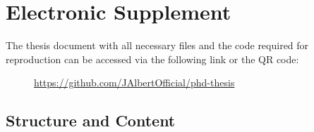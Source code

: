 \section{Electronic Supplement}


The thesis document with all necessary files and the code required for reproduction can be accessed via the following link or the QR code:

\begin{figure}[!h]
    \centering
    \begin{minipage}{0.6\textwidth}
        \centering
    \end{minipage}

    \begin{minipage}{0.8\textwidth}
        \centering
        \href{https://github.com/JAlbertOfficial/phd-thesis}{https://github.com/JAlbertOfficial/phd-thesis}
    \end{minipage}
\end{figure}

\vspace{-0.75cm}

\subsection*{Structure and Content}



